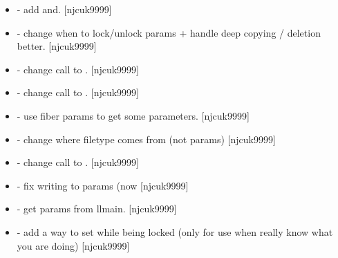\documentclass[a4paper,10pt,english]{report}
\begin{document}
\begin{itemize}
\item {} 
 - add  and.
{[}njcuk9999{]}

\item {} 
 - change when to lock/unlock
params + handle deep copying / deletion better. {[}njcuk9999{]}

\item {} 
 - change call to . {[}njcuk9999{]}

\item {} 
 - change call to . {[}njcuk9999{]}

\item {} 
 - use fiber params to get some
parameters. {[}njcuk9999{]}

\item {} 
 - change where filetype comes from (not params)
{[}njcuk9999{]}

\item {} 
 - change call to . {[}njcuk9999{]}

\item {} 
 - fix writing to params (now
 {[}njcuk9999{]}

\item {} 
 - get params from llmain. {[}njcuk9999{]}

\item {} 
 - add a way to set while being locked (only for use
when really know what you are doing) {[}njcuk9999{]}

\end{itemize}
\end{document}
